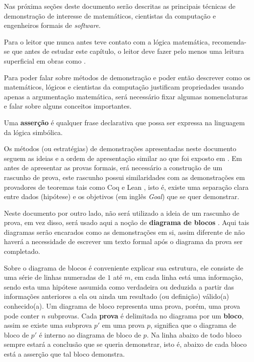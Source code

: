 Nas próxima seções deste documento serão descritas as principais técnicas de demonstração de interesse de matemáticos, cientistas da computação e engenheiros formais de \textit{software}.

\begin{dica}
  Para o leitor que nunca antes teve contato com a lógica matemática, recomenda-se que antes de estudar este capítulo, o leitor deve fazer pelo menos uma leitura superficial em obras como \cite{edgar2002, leonidas2002, joaoPavao2014}. 
\end{dica}

Para poder falar sobre métodos de demonstração e poder então descrever como os matemáticos, lógicos e cientistas da computação justificam propriedades usando apenas a argumentação matemática, será necessário fixar algumas nomenclaturas e falar sobre alguns conceitos importantes.

\begin{definicao}[Asserção]\label{def:Assercao}
	Uma \textbf{asserção} é qualquer frase declarativa que possa ser expressa na linguagem da lógica simbólica.
\end{definicao}

Os métodos (ou estratégias) de demonstrações apresentadas neste documento seguem as ideias e a ordem  de apresentação similar ao que foi exposto em \cite{velleman2019comProvar}. Em \cite{velleman2019comProvar} antes de apresentar as provas formais, erá necessário a construção de um rascunho de prova, este rascunho possui similaridades com as demonstrações em provadores de teoremas tais como Coq \cite{coq2013, softwarefoundations} e Lean \cite{lean2015}, isto é, existe uma separação clara entre dados (hipótese) e os objetivos (em inglês \textit{Goal}) que se quer demonstrar.

Neste documento por outro lado, não será utilizado a ideia de um rascunho de prova, em vez disso, será usado aqui a noção de \textbf{diagrama de blocos} \cite{broda2007}. Aqui tais diagramas serão encarados como as demonstrações em si, assim diferente de \cite{velleman2019comProvar} não haverá a necessidade de escrever um texto formal após o diagrama da prova ser completado.

Sobre o diagrama de blocos é conveniente explicar sua estrutura, ele consiste de uma série de linhas numeradas de $1$ até $m$, em cada linha está uma informação, sendo esta uma hipótese assumida como verdadeira ou deduzida a partir das informações anteriores a ela ou ainda um resultado (ou definição) válido(a) conhecido(a). Um diagrama de bloco representa uma prova, porém, uma prova pode conter $n$ subprovas. Cada \textbf{prova} é delimitada no diagrama por um \textbf{bloco}, assim se existe uma subprova $p'$ em uma prova $p$, significa que o diagrama de bloco de $p'$ é interno ao diagrama de bloco de $p$. Na linha abaixo de todo bloco sempre estará a conclusão que se queria demonstrar, isto é, abaixo de cada bloco está a asserção que tal bloco demonstra.

